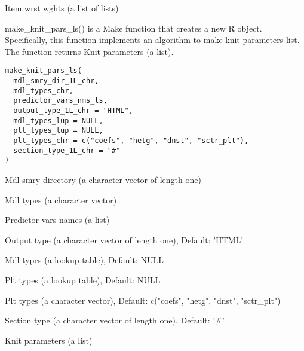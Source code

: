 \documentclass[a4paper]{book}
\begin{document}
%
\begin{Value}
Item wrst wghts (a list of lists)
\end{Value}
%
\begin{Description}\relax
make\_knit\_pars\_ls() is a Make function that creates a new R object. Specifically, this function implements an algorithm to make knit parameters list. The function returns Knit parameters (a list).
\end{Description}
%
\begin{Usage}
\begin{verbatim}
make_knit_pars_ls(
  mdl_smry_dir_1L_chr,
  mdl_types_chr,
  predictor_vars_nms_ls,
  output_type_1L_chr = "HTML",
  mdl_types_lup = NULL,
  plt_types_lup = NULL,
  plt_types_chr = c("coefs", "hetg", "dnst", "sctr_plt"),
  section_type_1L_chr = "#"
)
\end{verbatim}
\end{Usage}
%
\begin{Arguments}
\begin{ldescription}
\item[\code{mdl\_smry\_dir\_1L\_chr}] Mdl smry directory (a character vector of length one)

\item[\code{mdl\_types\_chr}] Mdl types (a character vector)

\item[\code{predictor\_vars\_nms\_ls}] Predictor vars names (a list)

\item[\code{output\_type\_1L\_chr}] Output type (a character vector of length one), Default: 'HTML'

\item[\code{mdl\_types\_lup}] Mdl types (a lookup table), Default: NULL

\item[\code{plt\_types\_lup}] Plt types (a lookup table), Default: NULL

\item[\code{plt\_types\_chr}] Plt types (a character vector), Default: c("coefs", "hetg", "dnst", "sctr\_plt")

\item[\code{section\_type\_1L\_chr}] Section type (a character vector of length one), Default: '\#'
\end{ldescription}
\end{Arguments}
%
\begin{Value}
Knit parameters (a list)
\end{Value}
\end{document}
